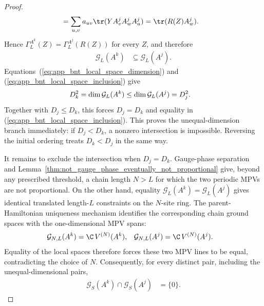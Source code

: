 \begin{proof}
\begin{align}
         & =\sum_{u,v}a_{uv}\tr(YA^j_vA^j_wA^j_u)
        =\tr(R(Z)A^j_w).
        \notag
    \end{align}
    Hence $\Gamma_L^{A^k}(Z)=\Gamma_L^{A^j}(R(Z))$ for every $Z$, and therefore
    \begin{align}
        \mathcal G_L(A^k) & \subseteq\mathcal G_L(A^j).
        \label{eq:app_bnt_local_space_inclusion}
    \end{align}
    Equations~(\ref{eq:app_bnt_local_space_dimension}) and
    (\ref{eq:app_bnt_local_space_inclusion}) give
    \begin{align}
        D_k^2
         & =\dim\mathcal G_L(A^k)
        \leq\dim\mathcal G_L(A^j)=D_j^2.
        \notag
    \end{align}
    Together with $D_j\leq D_k$, this forces $D_j=D_k$ and equality in
    (\ref{eq:app_bnt_local_space_inclusion}). This proves the unequal-dimension
    branch immediately: if $D_j<D_k$, a nonzero intersection is impossible.
    Reversing the initial ordering treats $D_k<D_j$ in the same way.

    It remains to exclude the intersection when $D_j=D_k$. Gauge-phase
    separation and Lemma~\ref{thm:not_gauge_phase_eventually_not_proportional}
    give, beyond any prescribed threshold, a chain length $N>L$ for which the
    two periodic MPVs are not proportional. On the other hand, equality
    $\mathcal G_L(A^k)=\mathcal G_L(A^j)$ gives identical translated
    length-$L$ constraints on the $N$-site ring. The parent-Hamiltonian
    uniqueness mechanism identifies the corresponding chain ground spaces
    with the one-dimensional MPV spans:
    \begin{align}
        \mathcal G_{N,L}(A^k)
         & =\C\,V^{(N)}(A^k),
         &
        \mathcal G_{N,L}(A^j)
         & =\C\,V^{(N)}(A^j).
        \notag
    \end{align}
    Equality of the local spaces therefore forces these two MPV lines to be
    equal, contradicting the choice of $N$. Consequently, for every distinct
    pair, including the unequal-dimensional pairs,
    \begin{align}
        \mathcal G_S(A^k)\cap\mathcal G_S(A^j) & =\{0\}.
        \label{eq:app_bnt_three_block_intersection_zero}
    \end{align}


\end{proof}
